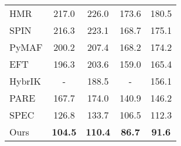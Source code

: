 \documentclass[runningheads]{llncs}
\begin{document}
\begin{table}[t]
\begin{minipage}[t]{0.48\linewidth}
{\begin{tabular}{l|cc|cc}
HMR \cite{kanazawa2018end} & 217.0  & 226.0 & 173.6 & 180.5\\
SPIN \cite{kolotouros2019learning} & 216.3  & 223.1 & 168.7 & 175.1\\
PyMAF \cite{zhang2021pymaf} & 200.2  & 207.4 & 168.2 & 174.2\\
EFT \cite{joo2021exemplar} & 196.3  & 203.6 & 159.0 & 165.4\\
HybrIK \cite{li2021hybrik} & - & 188.5 & - & 156.1 \\
PARE \cite{kocabas2021pare} & 167.7  & 174.0 & 140.9 & 146.2\\
SPEC \cite{kocabas2021spec} & 126.8 & 133.7 & 106.5 & 112.3 \\
\hline
Ours & \textbf{104.5} & \textbf{110.4} & \textbf{86.7} & \textbf{91.6} \\
\hline
\end{tabular}}
\end{minipage}
\end{table}
\end{document}
